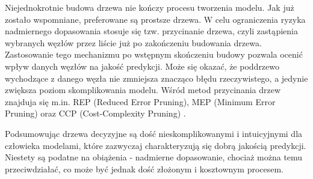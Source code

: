 Niejednokrotnie budowa drzewa nie kończy procesu tworzenia modelu. Jak już zostało wspomniane, preferowane są prostsze drzewa. W celu ograniczenia ryzyka nadmiernego dopasowania stosuje się tzw. przycinanie drzewa, czyli zastąpienia wybranych węzłów przez liście już po zakończeniu budowania drzewa. Zastosowanie tego mechanizmu po wstępnym skończeniu budowy pozwala ocenić wpływ danych węzłów na jakość predykcji. Może się okazać, że poddrzewo wychodzące z danego węzła nie zmniejsza znacząco błędu rzeczywistego, a jedynie zwiększa poziom skomplikowania modelu. Wśród metod przycinania drzew znajduja się m.in. REP (Reduced Error Pruning), MEP (Minimum Error Pruning) oraz CCP (Cost-Complexity Pruning) \cite{MOW}.

Podsumowując drzewa decyzyjne są dość nieskomplikowanymi i intuicyjnymi dla człowieka modelami, które zazwyczaj charakteryzują się dobrą jakością predykcji. Niestety są podatne na obiążenia - nadmierne dopasowanie, chociaż można temu przeciwdziałać, co może być jednak dość złożonym i kosztownym procesem.
